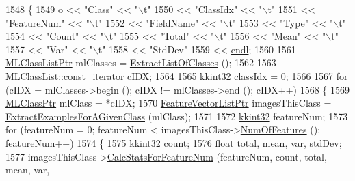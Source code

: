 \begin{DoxyCode}
1548 \{
1549   o << \textcolor{stringliteral}{"Class"}      << \textcolor{stringliteral}{"\(\backslash\)t"}
1550     << \textcolor{stringliteral}{"ClassIdx"}   << \textcolor{stringliteral}{"\(\backslash\)t"}
1551     << \textcolor{stringliteral}{"FeatureNum"} << \textcolor{stringliteral}{"\(\backslash\)t"}
1552     << \textcolor{stringliteral}{"FieldName"}  << \textcolor{stringliteral}{"\(\backslash\)t"}
1553     << \textcolor{stringliteral}{"Type"}       << \textcolor{stringliteral}{"\(\backslash\)t"}
1554     << \textcolor{stringliteral}{"Count"}      << \textcolor{stringliteral}{"\(\backslash\)t"}
1555     << \textcolor{stringliteral}{"Total"}      << \textcolor{stringliteral}{"\(\backslash\)t"}
1556     << \textcolor{stringliteral}{"Mean"}       << \textcolor{stringliteral}{"\(\backslash\)t"}
1557     << \textcolor{stringliteral}{"Var"}        << \textcolor{stringliteral}{"\(\backslash\)t"}
1558     << \textcolor{stringliteral}{"StdDev"}
1559     << \hyperlink{namespace_k_k_b_ad1f50f65af6adc8fa9e6f62d007818a8}{endl};
1560 
1561   \hyperlink{class_k_k_m_l_l_1_1_m_l_class_list}{MLClassListPtr}  mlClasses = \hyperlink{class_k_k_m_l_l_1_1_feature_vector_list_af4bffa9713e7632b9e0e33f931528164}{ExtractListOfClasses} ();   
1562 
1563   \hyperlink{class_k_k_b_1_1_k_k_queue_aeb057c9c010446f46f57c1e355f981f1}{MLClassList::const\_iterator} cIDX;
1564 
1565   \hyperlink{namespace_k_k_b_a8fa4952cc84fda1de4bec1fbdd8d5b1b}{kkint32}  classIdx = 0;
1566 
1567   \textcolor{keywordflow}{for}  (cIDX = mlClasses->begin ();  cIDX != mlClasses->end ();  cIDX++)
1568   \{
1569     \hyperlink{class_k_k_m_l_l_1_1_m_l_class}{MLClassPtr}  mlClass = *cIDX;
1570     \hyperlink{class_k_k_m_l_l_1_1_feature_vector_list}{FeatureVectorListPtr}  imagesThisClass = 
      \hyperlink{class_k_k_m_l_l_1_1_feature_vector_list_ab9c72c62046bf92e24e7e635d425792b}{ExtractExamplesForAGivenClass} (mlClass);
1571       
1572     \hyperlink{namespace_k_k_b_a8fa4952cc84fda1de4bec1fbdd8d5b1b}{kkint32}  featureNum;
1573     \textcolor{keywordflow}{for}  (featureNum = 0;  featureNum < imagesThisClass->\hyperlink{class_k_k_m_l_l_1_1_feature_vector_list_a9b14c44e69c63c7680547f0675ab3e7a}{NumOfFeatures} ();  featureNum++)
1574     \{
1575       \hyperlink{namespace_k_k_b_a8fa4952cc84fda1de4bec1fbdd8d5b1b}{kkint32}  count;
1576       \textcolor{keywordtype}{float}  total, mean, var, stdDev;
1577       imagesThisClass->\hyperlink{class_k_k_m_l_l_1_1_feature_vector_list_ac2a409481473e0c3cf3cdae64f156d41}{CalcStatsForFeatureNum} (featureNum, count, total, mean, var, 

\end{DoxyCode}
